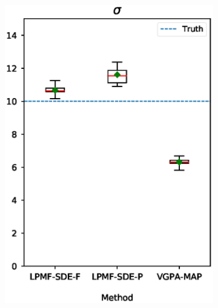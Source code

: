 \begin{frame}[t]
\begin{figure}
\begin{subfigure}{0.24\textwidth}
            \includegraphics[width=\linewidth]{graphics/lorenz-63-parameters-sigma-boxplot}
            \label{fig-lorenz-63-parameters-sigma-boxplot}
        \end{subfigure}
        \begin{subfigure}{0.24\textwidth}

\end{subfigure}
\end{figure}
\end{frame}
